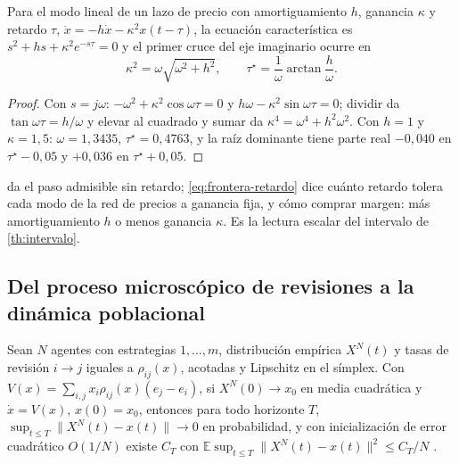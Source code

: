 \begin{proposicion}
\label{pr:frontera-retardo}
Para el modo lineal de un lazo de precio con amortiguamiento $h$, ganancia
$\kappa$ y retardo $\tau$, $\ddot x=-h\dot x-\kappa^2x(t-\tau)$, la ecuación
característica es $s^2+hs+\kappa^2e^{-s\tau}=0$ y el primer cruce del eje
imaginario ocurre en
\begin{equation}
  \label{eq:frontera-retardo}
  \kappa^2=\omega\sqrt{\omega^2+h^2},\qquad
  \tau^\star=\frac{1}{\omega}\arctan\frac{h}{\omega}.
\end{equation}
\end{proposicion}

\begin{proof}
Con $s=j\omega$: $-\omega^2+\kappa^2\cos\omega\tau=0$ y
$h\omega-\kappa^2\sin\omega\tau=0$; dividir da $\tan\omega\tau=h/\omega$ y
elevar al cuadrado y sumar da $\kappa^4=\omega^4+h^2\omega^2$. Con $h=1$ y
$\kappa=1{,}5$: $\omega=1{,}3435$, $\tau^\star=0{,}4763$, y la raíz dominante
tiene parte real $-0{,}040$ en $\tau^\star-0{,}05$ y $+0{,}036$ en
$\tau^\star+0{,}05$.
\end{proof}

\begin{observacion}
\label{obs:retardo-ventana}
 da el paso admisible sin retardo; \eqref{eq:frontera-retardo}
dice cuánto retardo tolera cada modo de la red de precios a ganancia fija,
y cómo comprar margen: más amortiguamiento $h$ o menos ganancia $\kappa$. Es
la lectura escalar del intervalo de \cref{th:intervalo}.
\end{observacion}

\subsection{Del proceso microscópico de revisiones a la dinámica poblacional}

\begin{proposicion}
\label{pr:limite-poblacion}
Sean $N$ agentes con estrategias $1,\dots,m$, distribución empírica $X^N(t)$
y tasas de revisión $i\to j$ iguales a $\rho_{ij}(x)$, acotadas y Lipschitz
en el símplex. Con $V(x)=\sum_{i,j}x_i\rho_{ij}(x)(e_j-e_i)$, si
$X^N(0)\to x_0$ en media cuadrática y $\dot x=V(x)$, $x(0)=x_0$, entonces
para todo horizonte $T$, $\sup_{t\le T}\lVert X^N(t)-x(t)\rVert\to0$ en
probabilidad, y con inicialización de error cuadrático $O(1/N)$ existe $C_T$
con $\mathbb E\sup_{t\le T}\lVert X^N(t)-x(t)\rVert^2\le C_T/N$
\cite{kurtz1970solutions,sandholm2010population}.
\end{proposicion}

